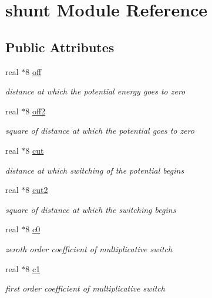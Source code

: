 \hypertarget{classshunt}{\section{shunt Module Reference}
\label{classshunt}
}
\subsection*{Public Attributes}
\begin{DoxyCompactItemize}
\item 
real $\ast$8 \hyperlink{classshunt_a2dbeaa3a17c69426a549bb3e98c51df9}{off}
\begin{DoxyCompactList}\small\item\em distance at which the potential energy goes to zero \end{DoxyCompactList}\item 
real $\ast$8 \hyperlink{classshunt_a1e0abe89467a0036f7b740bb6db645b6}{off2}
\begin{DoxyCompactList}\small\item\em square of distance at which the potential goes to zero \end{DoxyCompactList}\item 
real $\ast$8 \hyperlink{classshunt_a168837ca6103076f7e7817b18737780c}{cut}
\begin{DoxyCompactList}\small\item\em distance at which switching of the potential begins \end{DoxyCompactList}\item 
real $\ast$8 \hyperlink{classshunt_ac798484b6bbe20287e81c534f0989db9}{cut2}
\begin{DoxyCompactList}\small\item\em square of distance at which the switching begins \end{DoxyCompactList}\item 
real $\ast$8 \hyperlink{classshunt_aabf25759c6848e59a6563aec38086b44}{c0}
\begin{DoxyCompactList}\small\item\em zeroth order coefficient of multiplicative switch \end{DoxyCompactList}\item 
real $\ast$8 \hyperlink{classshunt_aa6800509bde03cfb64b0ea83c4279622}{c1}
\begin{DoxyCompactList}\small\item\em first order coefficient of multiplicative switch \end{DoxyCompactList}\item 

\end{DoxyCompactItemize}
